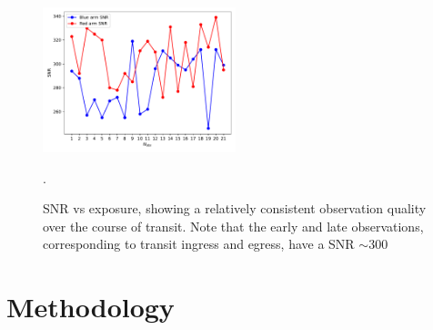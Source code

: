 \documentclass[twocolumn]{aastex631}
\begin{document}
        \begin{figure}
            \centering
            \includegraphics[width=0.5\textwidth]{plots/SNR.pdf}
            \caption{SNR vs exposure, showing a relatively consistent observation quality over the course of transit. Note that the early and late observations, corresponding to transit ingress and egress, have a SNR $\sim300$}.
            \label{fig:SNR}
        \end{figure}
        
    
    \section{Methodology}\label{sec:Methodology}
\end{document}
